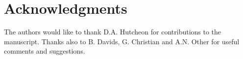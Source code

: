 \section{Acknowledgments}
The authors would like to thank D.A. Hutcheon for contributions to the manuscript. Thanks also to B. Davids, G. Christian and A.N. Other for useful comments and suggestions. 


